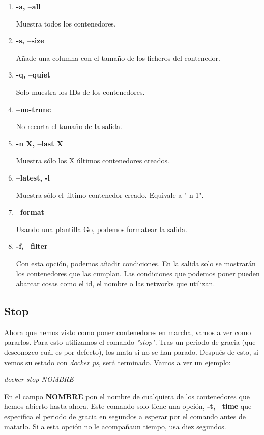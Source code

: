 \documentclass[]{article}
\begin{document}
\begin{enumerate}
	\renewcommand{\labelenumi}{$ \bullet $}
	\item {\bf -a, --all}
	
		Muestra todos los contenedores.
	\item {\bf -s, --size}
		
		Añade una columna con el tamaño de los ficheros del contenedor.
		
	\item {\bf -q, --quiet}
	
		Solo muestra los IDs de los contenedores.
		
	\item {\bf --no-trunc}
	
		No recorta el tamaño de la salida.
	\item {\bf -n X, --last X}
	
		Muestra sólo los X últimos contenedores creados.
	\item {\bf --latest, -l}
	
		Muestra sólo el último contenedor creado. Equivale a "-n 1".
	\item {\bf --format}
	
		Usando una plantilla Go, podemos formatear la salida.
	\item {\bf -f, --filter}
	
		Con esta opción, podemos añadir condiciones. En la salida solo se mostrarán los contenedores que las cumplan.
		Las condiciones que podemos poner pueden abarcar cosas como el id, el nombre o las networks que utilizan.

\end{enumerate}

\subsection{Stop}
Ahora que hemos visto como poner contenedores en marcha, vamos a ver como pararlos.
Para esto utilizamos el comando {\it "stop"}. Tras un periodo de gracia (que desconozco cuál es por defecto), los mata si no se han parado. Después de esto, si vemos su estado con {\it docker ps}, será terminado. Vamos a ver un ejemplo:

\begin{center}
\it
docker stop NOMBRE

\end{center}
En el campo {\bf NOMBRE} pon el nombre de cualquiera de los contenedores que hemos abierto hasta ahora.
Este comando solo tiene una opción, {\bf -t, --time} que especifica el periodo de gracia en segundos a esperar por el comando antes de matarlo. Si a esta opción no le acompañaun tiempo, usa diez segundos.
\end{document}
